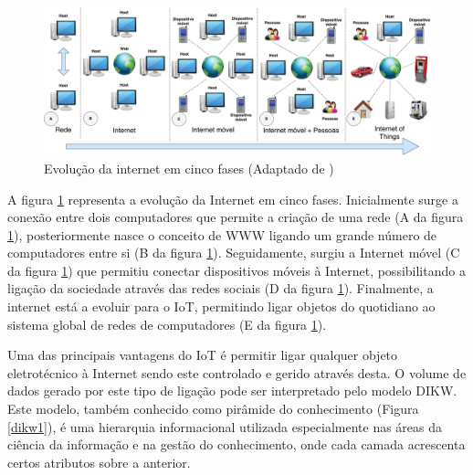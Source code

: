 \begin{figure}[h]
	\centering
	\includegraphics[width=\linewidth]{esquemas/iot-diagram.pdf}
	\caption[Evolução da internet em cinco fases]{ Evolução da internet em cinco fases (Adaptado de \cite{Our2013})}
	\label{iotEvolution}
\end{figure}


A figura \ref{iotEvolution} representa a evolução da Internet em cinco fases. Inicialmente surge a conexão entre dois computadores que permite a criação de uma rede (A da figura \ref{iotEvolution}), posteriormente nasce o conceito de \ac{WWW} ligando um grande número de computadores entre si (B da figura \ref{iotEvolution}). Seguidamente, surgiu a Internet móvel (C da figura \ref{iotEvolution}) que permitiu conectar dispositivos móveis à Internet, possibilitando a ligação da sociedade através das redes sociais (D da figura \ref{iotEvolution}).
Finalmente, a internet está a evoluir para o \ac{IoT}, permitindo ligar objetos do quotidiano ao sistema global de redes de computadores (E da figura \ref{iotEvolution})\cite{Our2013}.









Uma das principais vantagens do \ac{IoT} é permitir ligar qualquer objeto eletrotécnico à Internet sendo este controlado e gerido através desta. O volume de dados gerado por este tipo de ligação pode ser interpretado pelo modelo \ac{DIKW}\cite{Rowley2007}. Este modelo, também conhecido como pirâmide do conhecimento (Figura \ref{dikw1}), é uma hierarquia informacional utilizada especialmente nas áreas da ciência da informação e na gestão do conhecimento, onde cada camada acrescenta certos atributos sobre a anterior.


